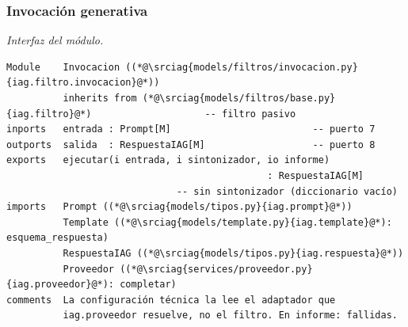 \documentclass[12pt]{report}
\newcommand{\iagrepo}{https://github.com/lbassani12/noticias_iag}
\newcommand{\iagref}{bca7dba0bc76cf5533bd8df1d9a27493d498942d}
\newcommand{\srciag}[2]{\href{\iagrepo/blob/\iagref/#1}{#2}}
\begin{document}
\subsubsection{Invocación generativa}
\label{sec:impl-mat-invocacion}

\noindent\begin{minipage}{\linewidth}
  \textit{Interfaz del módulo.}
  \begin{lstlisting}[style=implbloque]
Module    Invocacion ((*@\srciag{models/filtros/invocacion.py}{iag.filtro.invocacion}@*))
          inherits from (*@\srciag{models/filtros/base.py}{iag.filtro}@*)                    -- filtro pasivo
inports   entrada : Prompt[M]                         -- puerto 7
outports  salida  : RespuestaIAG[M]                   -- puerto 8
exports   ejecutar(i entrada, i sintonizador, io informe)
                                              : RespuestaIAG[M]
                              -- sin sintonizador (diccionario vacío)
imports   Prompt ((*@\srciag{models/tipos.py}{iag.prompt}@*))
          Template ((*@\srciag{models/template.py}{iag.template}@*): esquema_respuesta)
          RespuestaIAG ((*@\srciag{models/tipos.py}{iag.respuesta}@*))
          Proveedor ((*@\srciag{services/proveedor.py}{iag.proveedor}@*): completar)
comments  La configuración técnica la lee el adaptador que
          iag.proveedor resuelve, no el filtro. En informe: fallidas.
\end{lstlisting}
\end{minipage}
\end{document}
